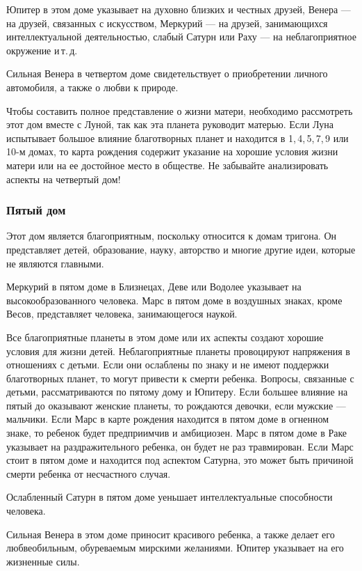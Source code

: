 Юпитер в этом доме указывает на духовно близких и честных друзей, Венера --- на друзей, связанных с искусством, Меркурий --- на друзей, занимающихся интеллектуальной деятельностью, слабый Сатурн или Раху --- на неблагоприятное окружение и\,т.\,д.

Сильная Венера в четвертом доме свидетельствует о приобретении личного автомобиля, а также о любви к природе.

Чтобы составить полное представление о жизни матери, необходимо рассмотреть этот дом вместе с Луной, так как эта планета руководит матерью. Если Луна испытывает большое влияние благотворных планет и находится в 1,\,4,\,5,\,7,\,9 или 10-м домах, то карта рождения содержит указание на хорошие условия жизни матери или на ее достойное место в обществе. Не забывайте анализировать аспекты на четвертый дом!

\subsubsection*{Пятый дом}

Этот дом является благоприятным, поскольку относится к домам тригона. Он представляет детей, образование, науку, авторство и многие другие идеи, которые не являются главными.

Меркурий в пятом доме в Близнецах, Деве или Водолее указывает на высокообразованного человека. Марс в пятом доме в воздушных знаках, кроме Весов, представляет человека, занимающегося наукой.

Все благоприятные планеты в этом доме или их аспекты создают хорошие условия для жизни детей. Неблагоприятные планеты провоцируют напряжения в отношениях с детьми. Если они ослаблены по знаку и не имеют поддержки благотворных планет, то могут привести к смерти ребенка. Вопросы, связанные с детьми, рассматриваются по пятому дому и Юпитеру. Если большее влияние на пятый до оказывают женские планеты, то рождаются девочки, если мужские --- мальчики. Если Марс в карте рождения находится в пятом доме в огненном знаке, то ребенок будет предприимчив и амбициозен. Марс в пятом доме в Раке указывает на раздражительного ребенка, он будет не раз травмирован. Если Марс стоит в пятом доме и находится под аспектом Сатурна, это может быть причиной смерти ребенка от несчастного случая.

Ослабленный Сатурн в пятом доме уеньшает интеллектуальные способности человека.

Сильная Венера в этом доме приносит красивого ребенка, а также делает его любвеобильным, обуреваемым мирскими желаниями. Юпитер указывает на его жизненные силы.


